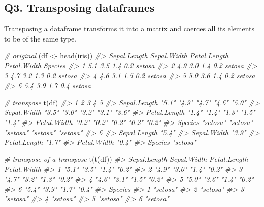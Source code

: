 \documentclass[
]{book}
\newenvironment{Shaded}{\begin{snugshade}}{\end{snugshade}}
\newcommand{\CommentTok}[1]{\textcolor[rgb]{0.56,0.35,0.01}{\textit{#1}}}
\newcommand{\FunctionTok}[1]{\textcolor[rgb]{0.00,0.00,0.00}{#1}}
\newcommand{\NormalTok}[1]{#1}
\newcommand{\OtherTok}[1]{\textcolor[rgb]{0.56,0.35,0.01}{#1}}
\begin{document}
\hypertarget{q3.-transposing-dataframes}{%
\subsection*{Q3. Transposing dataframes}\label{q3.-transposing-dataframes}}

Transposing a dataframe transforms it into a matrix and coerces all its elements to be of the same type.

\begin{Shaded}
\begin{Highlighting}[]
\CommentTok{\# original}
\NormalTok{(df }\OtherTok{\textless{}{-}} \FunctionTok{head}\NormalTok{(iris))}
\CommentTok{\#\textgreater{}   Sepal.Length Sepal.Width Petal.Length Petal.Width Species}
\CommentTok{\#\textgreater{} 1          5.1         3.5          1.4         0.2  setosa}
\CommentTok{\#\textgreater{} 2          4.9         3.0          1.4         0.2  setosa}
\CommentTok{\#\textgreater{} 3          4.7         3.2          1.3         0.2  setosa}
\CommentTok{\#\textgreater{} 4          4.6         3.1          1.5         0.2  setosa}
\CommentTok{\#\textgreater{} 5          5.0         3.6          1.4         0.2  setosa}
\CommentTok{\#\textgreater{} 6          5.4         3.9          1.7         0.4  setosa}

\CommentTok{\# transpose}
\FunctionTok{t}\NormalTok{(df)}
\CommentTok{\#\textgreater{}              1        2        3        4        5       }
\CommentTok{\#\textgreater{} Sepal.Length "5.1"    "4.9"    "4.7"    "4.6"    "5.0"   }
\CommentTok{\#\textgreater{} Sepal.Width  "3.5"    "3.0"    "3.2"    "3.1"    "3.6"   }
\CommentTok{\#\textgreater{} Petal.Length "1.4"    "1.4"    "1.3"    "1.5"    "1.4"   }
\CommentTok{\#\textgreater{} Petal.Width  "0.2"    "0.2"    "0.2"    "0.2"    "0.2"   }
\CommentTok{\#\textgreater{} Species      "setosa" "setosa" "setosa" "setosa" "setosa"}
\CommentTok{\#\textgreater{}              6       }
\CommentTok{\#\textgreater{} Sepal.Length "5.4"   }
\CommentTok{\#\textgreater{} Sepal.Width  "3.9"   }
\CommentTok{\#\textgreater{} Petal.Length "1.7"   }
\CommentTok{\#\textgreater{} Petal.Width  "0.4"   }
\CommentTok{\#\textgreater{} Species      "setosa"}

\CommentTok{\# transpose of a transpose}
\FunctionTok{t}\NormalTok{(}\FunctionTok{t}\NormalTok{(df))}
\CommentTok{\#\textgreater{}   Sepal.Length Sepal.Width Petal.Length Petal.Width}
\CommentTok{\#\textgreater{} 1 "5.1"        "3.5"       "1.4"        "0.2"      }
\CommentTok{\#\textgreater{} 2 "4.9"        "3.0"       "1.4"        "0.2"      }
\CommentTok{\#\textgreater{} 3 "4.7"        "3.2"       "1.3"        "0.2"      }
\CommentTok{\#\textgreater{} 4 "4.6"        "3.1"       "1.5"        "0.2"      }
\CommentTok{\#\textgreater{} 5 "5.0"        "3.6"       "1.4"        "0.2"      }
\CommentTok{\#\textgreater{} 6 "5.4"        "3.9"       "1.7"        "0.4"      }
\CommentTok{\#\textgreater{}   Species }
\CommentTok{\#\textgreater{} 1 "setosa"}
\CommentTok{\#\textgreater{} 2 "setosa"}
\CommentTok{\#\textgreater{} 3 "setosa"}
\CommentTok{\#\textgreater{} 4 "setosa"}
\CommentTok{\#\textgreater{} 5 "setosa"}
\CommentTok{\#\textgreater{} 6 "setosa"}


\end{Highlighting}
\end{Shaded}
\end{document}
